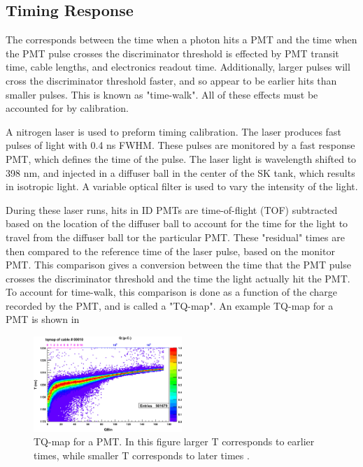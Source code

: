 \subsection{Timing Response}
The corresponds between the time when a photon hits a PMT and the time when the PMT pulse crosses the discriminator threshold is effected by PMT transit time, cable lengths, and electronics readout time.  Additionally, larger pulses will cross the discriminator threshold faster, and so appear to be earlier hits than smaller pulses.  This is known as "time-walk".  All of these effects must be accounted for by calibration. \par
A nitrogen laser is used to preform timing calibration.  The laser produces fast pulses of light with 0.4 ns FWHM.  These pulses are monitored by a fast response PMT, which defines the time of the pulse.  The laser light is wavelength shifted to 398 nm, and injected in a diffuser ball in the center of the SK tank, which results in isotropic light.  A variable optical filter is used to vary the intensity of the light.\par
During these laser runs, hits in ID PMTs are time-of-flight (TOF) subtracted based on the location of the diffuser ball to account for the time for the light to travel from the diffuser ball tor the particular PMT.  These "residual" times are then compared to the reference time of the laser pulse, based on the monitor PMT.  This comparison gives a conversion between the time that the PMT pulse crosses the discriminator threshold and the time the light actually hit the PMT.  To account for time-walk, this comparison is done as a function of the charge recorded by the PMT, and is called a "TQ-map".  An example TQ-map for a PMT is shown in 
\begin{figure}
\centering
\includegraphics[width=0.5\textwidth,keepaspectratio]{figures/TQ_map.png}
\caption{TQ-map for a PMT.  In this figure larger T corresponds to earlier times, while smaller T corresponds to later times \cite{Abe:2013gga}.}
\label{fig:pmt_linearity}	
\end{figure} 